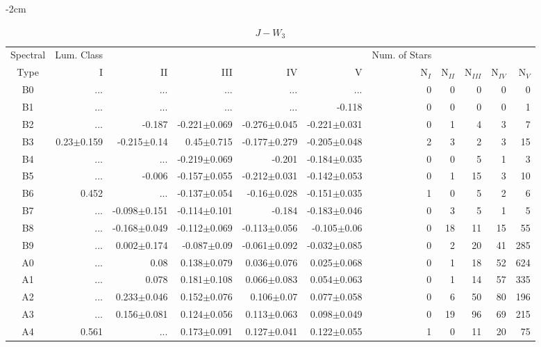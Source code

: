 \begin{table}[t]
\tiny
\centering
\caption{$J-W_{3}$}
\begin{center}
    \addtolength{\leftskip} {-2cm}
    \addtolength{\rightskip}{-2cm}
    \begin{tabular}{c|rrrrr|rrrrr}
    \toprule
    Spectral & Lum. Class & & & & & Num. of Stars & & & &  \\
    Type & I & II & III &  IV & V & N$_{I}$ & N$_{II}$ & N$_{III}$ & N$_{IV}$ & N$_{V}$ \\ \midrule
  
B0	&	 ...	&	 ...	&	 ...	&	 ...	&	 ...	&	0	&	0	&	0	&	0	&	0	\\
B1	&	 ...	&	 ...	&	 ...	&	 ...	&	-0.118	&	0	&	0	&	0	&	0	&	1	\\
B2	&	 ...	&	-0.187	&	-0.221$\pm$0.069	&	-0.276$\pm$0.045	&	-0.221$\pm$0.031	&	0	&	1	&	4	&	3	&	7	\\
B3	&	0.23$\pm$0.159	&	-0.215$\pm$0.14	&	0.45$\pm$0.715	&	-0.177$\pm$0.279	&	-0.205$\pm$0.048	&	2	&	3	&	2	&	3	&	15	\\
B4	&	 ...	&	 ...	&	-0.219$\pm$0.069	&	-0.201	&	-0.184$\pm$0.035	&	0	&	0	&	5	&	1	&	3	\\
B5	&	 ...	&	-0.006	&	-0.157$\pm$0.055	&	-0.212$\pm$0.031	&	-0.142$\pm$0.053	&	0	&	1	&	15	&	3	&	10	\\
B6	&	0.452	&	 ...	&	-0.137$\pm$0.054	&	-0.16$\pm$0.028	&	-0.151$\pm$0.035	&	1	&	0	&	5	&	2	&	6	\\
B7	&	 ...	&	-0.098$\pm$0.151	&	-0.114$\pm$0.101	&	-0.184	&	-0.183$\pm$0.046	&	0	&	3	&	5	&	1	&	5	\\
B8	&	 ...	&	-0.168$\pm$0.049	&	-0.112$\pm$0.069	&	-0.113$\pm$0.056	&	-0.105$\pm$0.06	&	0	&	18	&	11	&	15	&	55	\\
B9	&	 ...	&	0.002$\pm$0.174	&	-0.087$\pm$0.09	&	-0.061$\pm$0.092	&	-0.032$\pm$0.085	&	0	&	2	&	20	&	41	&	285	\\
A0	&	 ...	&	0.08	&	0.138$\pm$0.079	&	0.036$\pm$0.076	&	0.025$\pm$0.068	&	0	&	1	&	18	&	52	&	624	\\
A1	&	 ...	&	0.078	&	0.181$\pm$0.108	&	0.066$\pm$0.083	&	0.054$\pm$0.063	&	0	&	1	&	14	&	57	&	335	\\
A2	&	 ...	&	0.233$\pm$0.046	&	0.152$\pm$0.076	&	0.106$\pm$0.07	&	0.077$\pm$0.058	&	0	&	6	&	50	&	80	&	196	\\
A3	&	 ...	&	0.156$\pm$0.081	&	0.124$\pm$0.056	&	0.113$\pm$0.063	&	0.098$\pm$0.049	&	0	&	19	&	96	&	69	&	215	\\
A4	&	0.561	&	 ...	&	0.173$\pm$0.091	&	0.127$\pm$0.041	&	0.122$\pm$0.055	&	1	&	0	&	11	&	20	&	75	\\

\end{tabular}
\end{center}
\end{table}
